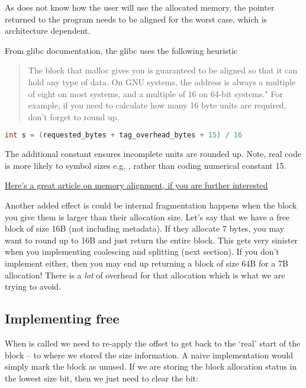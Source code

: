 As  does not know how the user will use the allocated memory, the pointer returned to the program needs to be aligned for the worst case, which is architecture dependent.

From glibc documentation, the glibc  uses the following heuristic
\begin{quote}
The block that malloc gives you is guaranteed to be aligned so that it can hold any type of data. On GNU systems, the address is always a multiple of eight on most systems, and a multiple of 16 on 64-bit systems." For example, if you need to calculate how many 16 byte units are required, don't forget to round up.
\end{quote}

\begin{lstlisting}[language=C]
int s = (requested_bytes + tag_overhead_bytes + 15) / 16
\end{lstlisting}

The additional constant ensures incomplete units are rounded up. Note, real code is more likely to symbol sizes e.g. , rather than coding numerical constant 15.

\href{http://www.ibm.com/developerworks/library/pa-dalign/}{Here's a great article on memory alignment, if you are further interested} 

Another added effect is could be internal fragmentation happens when the block you give them is larger than their allocation size.
Let's say that we have a free block of size 16B (not including metadata).
If they allocate 7 bytes, you may want to round up to 16B and just return the entire block.
This gets very sinister when you implementing coalescing and splitting (next section).
If you don't implement either, then you may end up returning a block of size 64B for a 7B allocation!
There is a \emph{lot} of overhead for that allocation which is what we are trying to avoid.

\subsection{Implementing free}

When  is called we need to re-apply the offset to get back to the `real' start of the block -- to where we stored the size information.
A naive implementation would simply mark the block as unused. If we are storing the block allocation status in the lowest size bit, then we just need to clear the bit:

